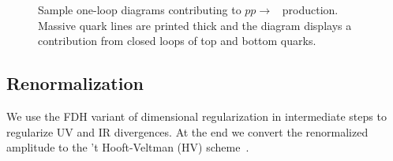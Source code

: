 \begin{figure}[h]
  \centering
  \qquad
  \quad
  \caption{Sample one-loop diagrams contributing
    to \mbox{$pp\rightarrow$ \Wbbnj[3]{}} production. Massive quark
    lines are printed thick and the diagram \protect{} displays a contribution
  from closed loops of top and bottom quarks.}
  \label{fig:FDsWbb3j}
\end{figure}



\subsection{Renormalization}
We use the FDH variant of dimensional regularization in intermediate steps to
regularize UV and IR divergences. At the end we convert the renormalized
amplitude to the 't Hooft-Veltman (HV) scheme~\cite{tHooft:1972tcz}.


